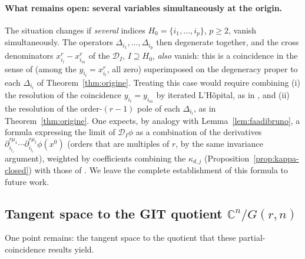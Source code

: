 \documentclass[10pt,a4paper]{amsart}
\newcommand{\CC}{\mathbb{C}}
\begin{document}
\paragraph{What remains open: several variables simultaneously at the origin.} The situation changes if \emph{several} indices $H_0=\{i_1,\dots,i_p\}$, $p\ge2$, vanish simultaneously. The operators $\Delta_{i_1},\dots,\Delta_{i_p}$ then degenerate together, and the cross denominators $x_{i_l}^r-x_{i_m}^r$ of the $\mathcal D_I$, $I\supseteq H_0$, \emph{also} vanish: this is a coincidence in the sense of \cite[Theorem~24]{Ze} (among the $y_{i_l}=x_{i_l}^r$, all zero) superimposed on the degeneracy proper to each $\Delta_{i_l}$ of Theorem~\ref{thm:origine}. Treating this case would require combining (i) the resolution of the coincidence $y_{i_l}=y_{i_m}$ by iterated L'Hôpital, as in \cite[Lemmas~26--28]{Ze}, and (ii) the resolution of the order-$(r-1)$ pole of each $\Delta_{i_l}$, as in Theorem~\ref{thm:origine}. One expects, by analogy with Lemma~\ref{lem:faadibruno}, a formula expressing the limit of $\mathcal D_I\phi$ as a combination of the derivatives $\partial_{i_{l_1}}^{r\mu_1}\cdots\partial_{i_{l_t}}^{r\mu_t}\phi(x^0)$ (orders that are multiples of $r$, by the same invariance argument), weighted by coefficients combining the $\kappa_{d,j}$ (Proposition~\ref{prop:kappa-closed}) with those of \cite[Theorem~24]{Ze}. We leave the complete establishment of this formula to future work.

\subsection{Tangent space to the GIT quotient $\CC^n/G(r,n)$}

One point remains: the tangent space to the quotient that these partial-coincidence results yield.
\end{document}

